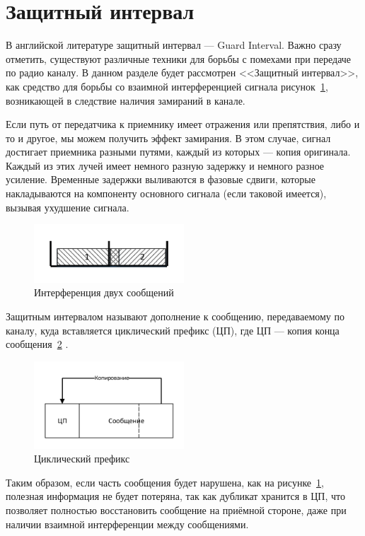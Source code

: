 \section{Защитный интервал}
В английской литературе защитный интервал --- Guard Interval.
Важно сразу отметить, существуют различные техники для борьбы с помехами при передаче по радио 
каналу. В данном разделе будет рассмотрен <<Защитный интервал>>, как средство для борьбы со взаимной
интерференцией сигнала рисунок~\ref{fig:kov_interf}, возникающей в следствие наличия замираний в канале.

Если путь от передатчика к приемнику имеет отражения или 
препятствия, либо и то и другое, мы можем получить эффект замирания. В этом случае, сигнал достигает
приемника разными путями, каждый из которых --- копия оригинала. Каждый из этих лучей имеет
немного разную задержку и немного разное усиление. Временные задержки выливаются в
фазовые сдвиги, которые накладываются на компоненту основного сигнала (если таковой
имеется), вызывая ухудшение сигнала.

\begin{figure}[H]
    \centering
    \includegraphics[width=0.5\textwidth]{img/kov_interf}
    \caption{Интерференция двух сообщений}
    \label{fig:kov_interf}
\end{figure}

Защитным интервалом называют дополнение к сообщению, передаваемому по каналу, куда вставляется
циклический префикс (ЦП), где ЦП --- копия конца сообщения~\ref{fig:kov_CP} .

\begin{figure}[H]
    \centering
    \includegraphics[width=0.5\textwidth]{img/kov_CP}
    \caption{Циклический префикс}
    \label{fig:kov_CP}
\end{figure}

Таким образом, если часть сообщения будет нарушена, как на рисунке~\ref{fig:kov_interf}, полезная 
информация не будет потеряна, так как дубликат хранится в ЦП, что позволяет полностью восстановить
сообщение на приёмной стороне, даже при наличии взаимной интерференции между сообщениями.
\newpage